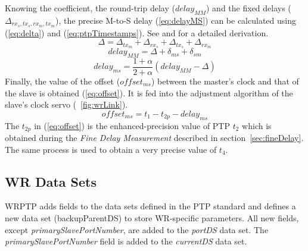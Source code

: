 Knowing the coefficient, the round-trip delay ($delay_{MM}$)
and the fixed delays ($\Delta_{rx_s,tx_s,rx_m,tx_m}$), 
the precise M-to-S delay (\ref{eq:delayMS}) can be calculated using (\ref{eq:delta}) and
(\ref{eq:ptpTimestamps}). See \cite{biblio:WRPTP} and
\cite{biblio:TomekMSc} for a detailed derivation.
\begin{equation}
\label{eq:delta}
  \Delta = \Delta_{tx_m} + \Delta_{rx_s} + \Delta_{tx_s} + \Delta_{rx_m}
\end{equation}
\begin{equation}
\label{eq:ptpTimestamps}
  delay_{MM} =  \Delta + \delta_{ms} +\delta_{sm}
\end{equation}
\begin{equation}
\label{eq:delayMS}
  delay_{ms} = \frac{1 + \alpha}{2 + \alpha}(delay_{MM}-\Delta)
\end{equation}
Finally, the value of the offset ($offset_{ms}$) between the master's
clock and that of the slave is obtained (\ref{eq:offset}). It is fed
into the adjustment algorithm of the slave's clock servo
(\figurename~\ref{fig:wrLink}).
\begin{equation}
\label{eq:offset}
  offset_{ms} = t_1-t_{2p} - delay_{ms}
\end{equation}
The $t_{2p}$ in (\ref{eq:offset}) is the enhanced-precision value of PTP $t_2$ 
which is obtained during the \textit{Fine Delay Measurement} described
in section~\ref{sec:fineDelay}. The same process is used to obtain a very precise
value of $t_{4}$.




\subsection{WR Data Sets}
\label{sec:wrDataSet}

WRPTP adds fields to the data sets defined in the PTP standard 
and defines a new data set (backupParentDS) to store WR-specific parameters. All new fields, except
\textit{primarySlavePortNumber}, are added to the \textit{portDS} data set. 
The \textit{primarySlavePortNumber} field is added to the \textit{currentDS} data set.

